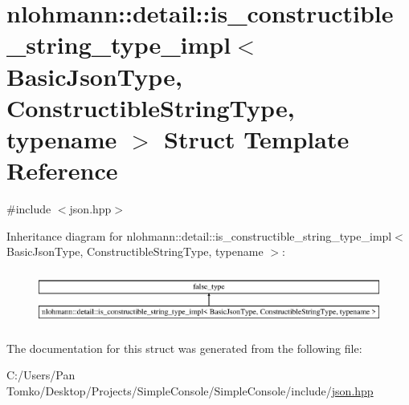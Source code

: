 \hypertarget{structnlohmann_1_1detail_1_1is__constructible__string__type__impl}{}\section{nlohmann\+::detail\+::is\+\_\+constructible\+\_\+string\+\_\+type\+\_\+impl$<$ Basic\+Json\+Type, Constructible\+String\+Type, typename $>$ Struct Template Reference}
\label{structnlohmann_1_1detail_1_1is__constructible__string__type__impl}


{\ttfamily \#include $<$json.\+hpp$>$}

Inheritance diagram for nlohmann\+::detail\+::is\+\_\+constructible\+\_\+string\+\_\+type\+\_\+impl$<$ Basic\+Json\+Type, Constructible\+String\+Type, typename $>$\+:\begin{figure}[H]
\begin{center}
\leavevmode
\includegraphics[height=1.809370cm]{de/df0/structnlohmann_1_1detail_1_1is__constructible__string__type__impl}
\end{center}
\end{figure}


The documentation for this struct was generated from the following file\+:\begin{DoxyCompactItemize}
\item 
C\+:/\+Users/\+Pan Tomko/\+Desktop/\+Projects/\+Simple\+Console/\+Simple\+Console/include/\mbox{\hyperlink{json_8hpp}{json.\+hpp}}\end{DoxyCompactItemize}
